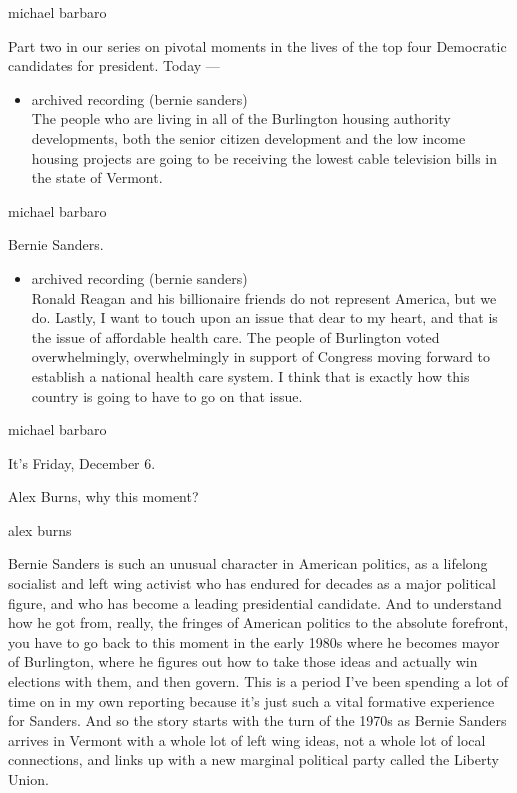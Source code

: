 michael barbaro

Part two in our series on pivotal moments in the lives of the top four
Democratic candidates for president. Today ---

\begin{itemize}
\tightlist
\item
  archived recording (bernie sanders)\\
  The people who are living in all of the Burlington housing authority
  developments, both the senior citizen development and the low income
  housing projects are going to be receiving the lowest cable television
  bills in the state of Vermont.
\end{itemize}

michael barbaro

Bernie Sanders.

\begin{itemize}
\tightlist
\item
  archived recording (bernie sanders)\\
  Ronald Reagan and his billionaire friends do not represent America,
  but we do. Lastly, I want to touch upon an issue that dear to my
  heart, and that is the issue of affordable health care. The people of
  Burlington voted overwhelmingly, overwhelmingly in support of Congress
  moving forward to establish a national health care system. I think
  that is exactly how this country is going to have to go on that issue.
\end{itemize}

michael barbaro

It's Friday, December 6.

Alex Burns, why this moment?

alex burns

Bernie Sanders is such an unusual character in American politics, as a
lifelong socialist and left wing activist who has endured for decades as
a major political figure, and who has become a leading presidential
candidate. And to understand how he got from, really, the fringes of
American politics to the absolute forefront, you have to go back to this
moment in the early 1980s where he becomes mayor of Burlington, where he
figures out how to take those ideas and actually win elections with
them, and then govern. This is a period I've been spending a lot of time
on in my own reporting because it's just such a vital formative
experience for Sanders. And so the story starts with the turn of the
1970s as Bernie Sanders arrives in Vermont with a whole lot of left wing
ideas, not a whole lot of local connections, and links up with a new
marginal political party called the Liberty Union.

